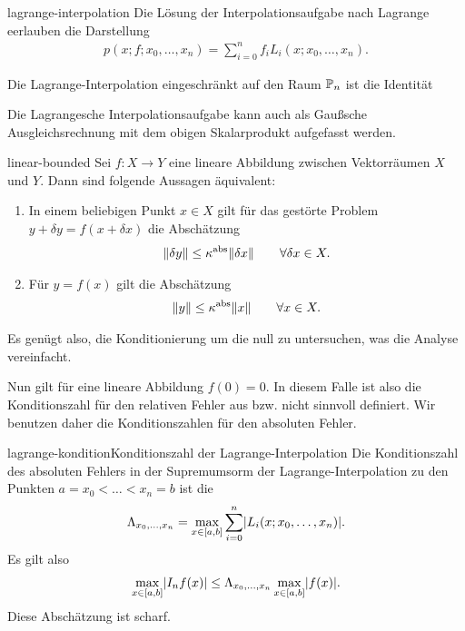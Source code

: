 \begin{Korollar}{lagrange-interpolation}
  Die Lösung der Interpolationsaufgabe nach Lagrange eerlauben die Darstellung
  \begin{gather}
    p(x;f;x_0,\dots,x_n) = \sum_{i=0}^n f_i L_i(x;x_0,\dots,x_n).
  \end{gather}
  
  Die Lagrange-Interpolation eingeschränkt auf den Raum $\P_n$ ist die
  Identität
\end{Korollar}

\begin{remark}
  Die Lagrangesche Interpolationsaufgabe kann auch als Gaußsche
  Ausgleichsrechnung mit dem obigen Skalarprodukt aufgefasst werden.
\end{remark}

\begin{Lemma}{linear-bounded}
  Sei $f\colon X \to Y$ eine lineare Abbildung zwischen Vektorräumen
  $X$ und $Y$. Dann sind folgende Aussagen äquivalent:
  \begin{enumerate}
  \item In einem beliebigen Punkt $x\in X$ gilt für das gestörte Problem
    $y+\delta y = f(x+\delta x)$ die Abschätzung
    \begin{gather}
      \norm{\delta y} \le \kappa^{\text{abs}} \norm{\delta x}
      \qquad\forall \delta x \in X.
    \end{gather}
  \item Für $y = f(x)$ gilt die Abschätzung
    \begin{gather}
      \norm{y} \le \kappa^{\text{abs}} \norm{x}
      \qquad\forall x \in X.
    \end{gather}
  \end{enumerate}
\end{Lemma}

\begin{remark}
  Es genügt also, die Konditionierung um die null zu untersuchen, was
  die Analyse vereinfacht.

  Nun gilt für eine lineare Abbildung $f(0) = 0$. In diesem Falle ist
  also die Konditionszahl für den relativen Fehler aus
  bzw.  nicht sinnvoll definiert. Wir
  benutzen daher die Konditionszahlen für den absoluten Fehler. 
\end{remark}

\begin{Satz*}{lagrange-kondition}{Konditionszahl der Lagrange-Interpolation}
  Die Konditionszahl des absoluten Fehlers in der Supremumsorm der
  Lagrange-Interpolation zu den Punkten $a = x_0 < \dots < x_n = b$
  ist die 
  \begin{gather}
    \Lambda_{x_0,\dots,x_n} = \max_{x\in [a,b]}
    \sum_{i=0}^n \abs{L_i(x;x_0,\dots,x_n)}.
  \end{gather}
  Es gilt also
  \begin{gather}
    \max _{x\in[a,b]} \abs{I_n f(x)}
    \le \Lambda_{x_0,\dots,x_n} \max _{x\in[a,b]} \abs{f(x)}.
  \end{gather}
  Diese Abschätzung ist scharf.
\end{Satz*}

